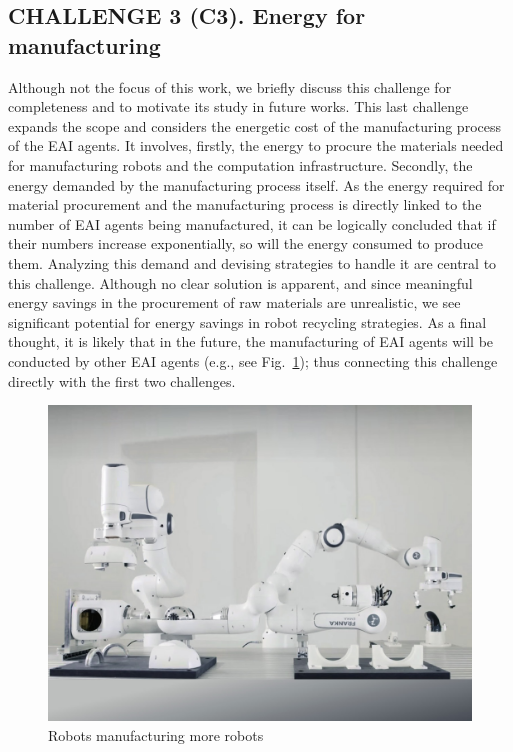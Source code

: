 \subsection{\textbf{CHALLENGE 3} (C3). Energy for manufacturing}
Although not the focus of this work, we briefly discuss this challenge for completeness and to motivate its study in future works. This last challenge expands the scope and considers the energetic cost of the manufacturing process of the EAI agents. It involves, firstly, the energy to procure the materials needed for manufacturing robots and the computation infrastructure. Secondly, the energy demanded by the manufacturing process itself. As the energy required for material procurement and the manufacturing process is directly linked to the number of EAI agents being manufactured, it can be logically concluded that if their numbers increase exponentially, so will the energy consumed to produce them. Analyzing this demand and devising strategies to handle it are central to this challenge. Although no clear solution is apparent, and since meaningful energy savings in the procurement of raw materials are unrealistic, we see significant potential for energy savings in robot recycling strategies. As a final thought, it is likely that in the future, the manufacturing of EAI agents will be conducted by other EAI agents (e.g., see Fig.~\ref{fig:franka_builds_franka}); thus connecting this challenge directly with the first two challenges.
\begin{figure}[!t]
	\centering
	\includegraphics[width=0.75\columnwidth]{fig/franka_builds_franka.jpg}
	\caption{Robots manufacturing more robots}
	\label{fig:franka_builds_franka}
\end{figure}

